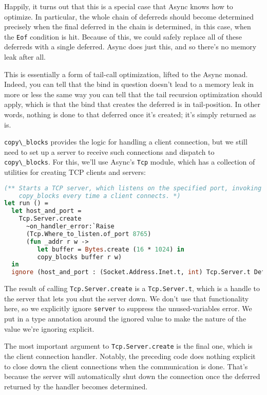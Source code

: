 Happily, it turns out that this is a special case that Async knows how
to optimize. In particular, the whole chain of deferreds should become
determined precisely when the final deferred in the chain is determined,
in this case, when the \passthrough{\lstinline!Eof!} condition is hit.
Because of this, we could safely replace all of these deferreds with a
single deferred. Async does just this, and so there's no memory leak
after all.

This is essentially a form of tail-call optimization, lifted to the
Async monad. Indeed, you can tell that the bind in question doesn't lead
to a memory leak in more or less the same way you can tell that the tail
recursion optimization should apply, which is that the bind that creates
the deferred is in tail-position. In other words, nothing is done to
that deferred once it's created; it's simply returned as is.

\passthrough{\lstinline!copy\_blocks!} provides the logic for handling a
client connection, but we still need to set up a server to receive such
connections and dispatch to \passthrough{\lstinline!copy\_blocks!}. For
this, we'll use Async's \passthrough{\lstinline!Tcp!} module, which has
a collection of utilities for creating TCP clients and servers:

\begin{lstlisting}[language=Caml]
(** Starts a TCP server, which listens on the specified port, invoking
    copy_blocks every time a client connects. *)
let run () =
  let host_and_port =
    Tcp.Server.create
      ~on_handler_error:`Raise
      (Tcp.Where_to_listen.of_port 8765)
      (fun _addr r w ->
         let buffer = Bytes.create (16 * 1024) in
         copy_blocks buffer r w)
  in
  ignore (host_and_port : (Socket.Address.Inet.t, int) Tcp.Server.t Deferred.t)
\end{lstlisting}

The result of calling \passthrough{\lstinline!Tcp.Server.create!} is a
\passthrough{\lstinline!Tcp.Server.t!}, which is a handle to the server
that lets you shut the server down. We don't use that functionality
here, so we explicitly ignore \passthrough{\lstinline!server!} to
suppress the unused-variables error. We put in a type annotation around
the ignored value to make the nature of the value we're ignoring
explicit.

The most important argument to
\passthrough{\lstinline!Tcp.Server.create!} is the final one, which is
the client connection handler. Notably, the preceding code does nothing
explicit to close down the client connections when the communication is
done. That's because the server will automatically shut down the
connection once the deferred returned by the handler becomes determined.

